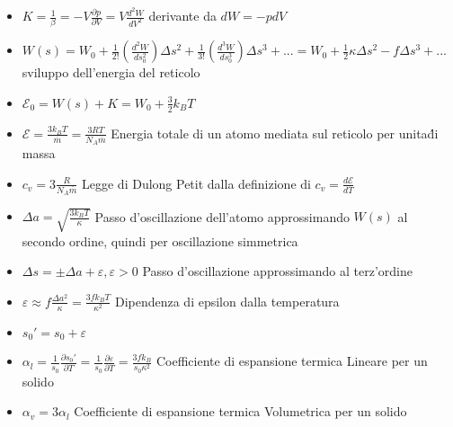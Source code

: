 \documentclass[a4paper]{article}
\begin{document}
\begin{itemize}
	\item $K=\frac{1}{\beta}=-V \frac{\partial p}{\partial V} = V\frac{d^2W}{dV^2}$ derivante da $dW=-pdV$
	\item $W(s)=W_0+\frac{1}{2!}(\frac{d^2W}{ds_0^2})\Delta s^2+\frac{1}{3!}(\frac{d^3W}{ds_0^3}) \Delta s^3+...=W_0+\frac{1}{2}\kappa\Delta s^2-f \Delta s^3+...$ sviluppo dell'energia del reticolo
	\item $\mathcal{E}_0 =W(s)+ K =W_0+\frac{3}{2}k_BT$ 
	\item $\mathcal{E} = \frac{3k_BT}{\overline{m}} = \frac{3RT}{N_A \overline{m}}$ Energia totale di un atomo mediata sul reticolo per unita\' di massa
	\item $c_v = 3 \frac{R}{N_A \overline{m}}$ Legge di Dulong Petit dalla definizione di $c_v=\frac{d \mathcal{E}}{dT}$
	\item $\Delta a = \sqrt{\frac{3k_BT}{\kappa}}$ Passo d'oscillazione dell'atomo approssimando $W(s)$ al secondo ordine, quindi per oscillazione simmetrica
	\item $\Delta s = \pm \Delta a + \varepsilon, \varepsilon > 0$ Passo d'oscillazione approssimando al terz'ordine
	\item $\varepsilon \approx f \frac{\Delta a^2}{\kappa} = \frac{3fk_BT}{\kappa^2}$ Dipendenza di epsilon dalla temperatura
	\item $s_0'= s_0 + \varepsilon$
	\item $\alpha_l = \frac{1}{s_0} \frac{\partial s_0'}{\partial T}  = \frac{1}{s_0} \frac{\partial \varepsilon}{\partial T} = \frac{3fk_B}{s_0\kappa^2}$ Coefficiente di espansione termica Lineare per un solido
	\item $\alpha_v = 3\alpha_l$ Coefficiente di espansione termica Volumetrica per un solido
\end{itemize}
\end{document}
